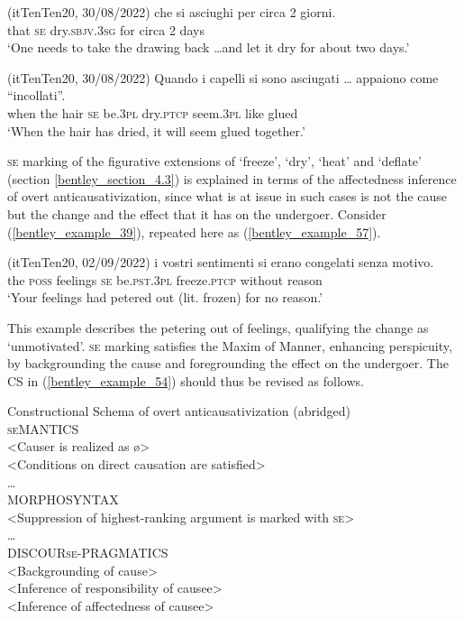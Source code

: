 \documentclass[output=paper,colorlinks,citecolor=brown
]{langscibook}
\begin{document}
\hspace*{\fill}(itTenTen20, 30/08/2022)\quad
\ea \label{bentley_example_55}
 che		si		asciughi					per		circa	2	giorni. \\
	{} that	\textsc{se}		dry.\textsc{sbjv}.3\textsc{sg}		for		circa	2	days \\
\glt 			‘One needs to take the drawing back \ldots  and let it dry for about two days.’
\z

\hspace*{\fill}(itTenTen20, 30/08/2022)\quad
\ea \label{bentley_example_56} 
\gll Quando		i			capelli	si		sono 		asciugati  {\ldots }	appaiono		come “incollati”. \\
	when				the	hair			\textsc{se}		be.3\textsc{pl}	dry.\textsc{ptcp}	{}					seem.3\textsc{pl}		like			glued  \\
\glt 			‘When the hair has dried, it will seem glued together.’
\z

\textsc{se} marking of the figurative extensions of ‘freeze’, ‘dry’, ‘heat’ and ‘deflate’ (section \ref{bentley_section_4.3}) is explained in terms of the affectedness inference of overt anticausativization, since what is at issue in such cases is not the cause but the change and the effect that it has on the undergoer. Consider (\ref{bentley_example_39}), repeated here as (\ref{bentley_example_57}). 

\hspace*{\fill}(itTenTen20, 02/09/2022)\quad
\ea \label{bentley_example_57}
\gll  {\ldots}  i			vostri		sentimenti		si		erano 				congelati		senza			motivo.  \\
	{} 	the	\textsc{poss}			feelings				\textsc{se}		be.\textsc{pst}.3\textsc{pl}	freeze.\textsc{ptcp}	without	reason	 \\
\glt 			‘Your feelings had petered out (lit. frozen) for no reason.’	
\z

This example describes the petering out of feelings, qualifying the change as ‘unmotivated’. \textsc{se} marking satisfies the Maxim of Manner, enhancing perspicuity, by backgrounding the cause and foregrounding the effect on the undergoer. The CS in (\ref{bentley_example_54}) should thus be revised as follows.

\ea \label{bentley_example_58}
Constructional Schema of overt anticausativization (abridged)\\
\textsc{se}MANTICS\\
<Causer is realized as \o>\\
<Conditions on direct causation are satisfied>\\
 \ldots \\
MORPHOSYNTAX\\
<Suppression of highest-ranking argument is marked with \textsc{se}>\\
 \ldots \\
DISCOUR\textsc{se}-PRAGMATICS\\
<Backgrounding of cause>\\
<Inference of responsibility of causee>\\
<Inference of affectedness of causee>\\
\z
\end{document}
